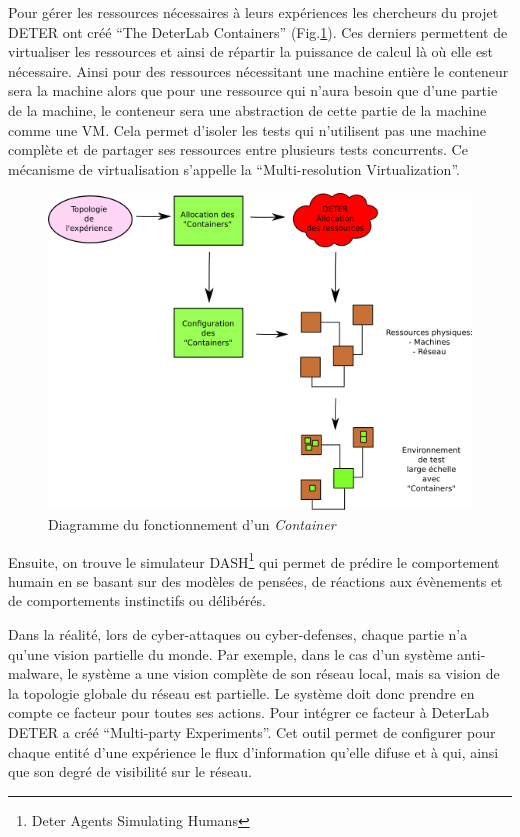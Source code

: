 Pour gérer les ressources nécessaires à leurs expériences les chercheurs du
projet DETER ont créé ``The DeterLab Containers'' (Fig.\ref{Conteneur}). Ces
derniers permettent de virtualiser les ressources et ainsi de répartir la
puissance de calcul là où elle est nécessaire. Ainsi pour des ressources
nécessitant une machine entière le conteneur sera la machine alors que pour une
ressource qui n'aura besoin que d'une partie de la machine, le conteneur sera
une abstraction de cette partie de la machine comme une VM. Cela permet d'isoler
les tests qui n'utilisent pas une machine complète et de partager ses ressources
entre plusieurs tests concurrents. Ce mécanisme de virtualisation s'appelle la
``Multi-resolution Virtualization''.

\begin{figure}
  \centering \includegraphics[scale=0.75]{Pictures/png/Deter_fonctionnement_v2}
  \caption{Diagramme du fonctionnement d'un \textit{Container}}
  \label{Conteneur}
\end{figure}

Ensuite, on trouve le simulateur DASH\footnote{Deter Agents
  Simulating Humans} qui permet de prédire le comportement humain en se basant
sur des modèles de pensées, de réactions aux évènements et de comportements
instinctifs ou délibérés.

Dans la réalité, lors de cyber-attaques ou cyber-defenses, chaque partie n'a qu'une
vision partielle du monde. Par exemple, dans le cas d'un système anti-malware, le
système a une vision complète de son réseau local, mais sa vision de la
topologie globale du réseau est partielle. Le système doit donc prendre
en compte ce facteur pour toutes ses actions. Pour intégrer ce facteur à
DeterLab DETER a créé ``Multi-party Experiments''. Cet outil permet de
configurer pour chaque entité d'une expérience le flux d'information qu'elle
difuse et à qui, ainsi que son degré de visibilité sur le réseau.


